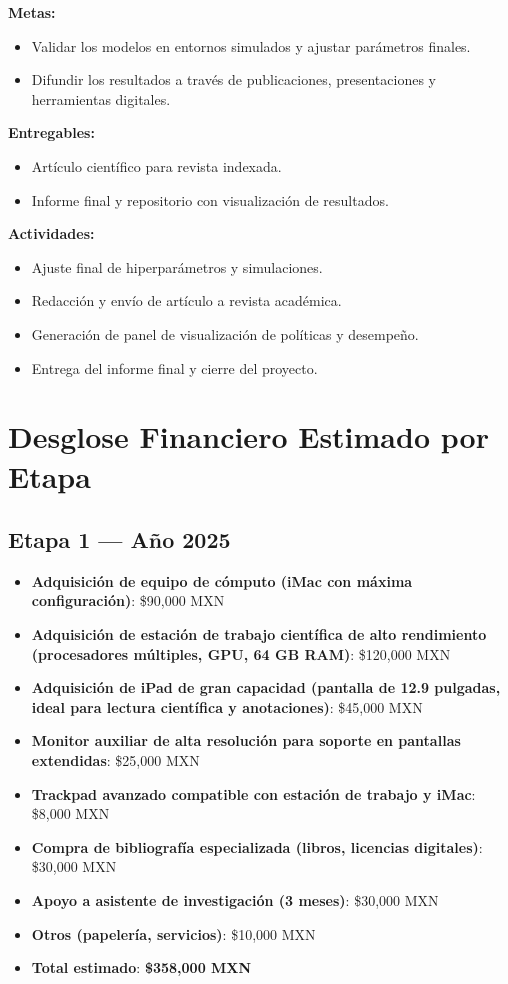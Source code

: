 \documentclass[12pt]{article}
\begin{document}
\textbf{Metas:}
\begin{itemize}
  \item Validar los modelos en entornos simulados y ajustar parámetros finales.
  \item Difundir los resultados a través de publicaciones, presentaciones y herramientas digitales.
\end{itemize}

\textbf{Entregables:}
\begin{itemize}
  \item Artículo científico para revista indexada.
  \item Informe final y repositorio con visualización de resultados.
\end{itemize}

\textbf{Actividades:}
\begin{itemize}
  \item Ajuste final de hiperparámetros y simulaciones.
  \item Redacción y envío de artículo a revista académica.
  \item Generación de panel de visualización de políticas y desempeño.
  \item Entrega del informe final y cierre del proyecto.
\end{itemize}

\section{Desglose Financiero Estimado por Etapa}

\subsection*{Etapa 1 — Año 2025}
\begin{itemize}
  \item \textbf{Adquisición de equipo de cómputo (iMac con máxima configuración)}: \$90,000 MXN
  \item \textbf{Adquisición de estación de trabajo científica de alto rendimiento (procesadores múltiples, GPU, 64 GB RAM)}: \$120,000 MXN
  \item \textbf{Adquisición de iPad de gran capacidad (pantalla de 12.9 pulgadas, ideal para lectura científica y anotaciones)}: \$45,000 MXN
  \item \textbf{Monitor auxiliar de alta resolución para soporte en pantallas extendidas}: \$25,000 MXN
  \item \textbf{Trackpad avanzado compatible con estación de trabajo y iMac}: \$8,000 MXN
  \item \textbf{Compra de bibliografía especializada (libros, licencias digitales)}: \$30,000 MXN
  \item \textbf{Apoyo a asistente de investigación (3 meses)}: \$30,000 MXN
  \item \textbf{Otros (papelería, servicios)}: \$10,000 MXN
  \item \textbf{Total estimado}: \textbf{\$358,000 MXN}
\end{itemize}
\end{document}
